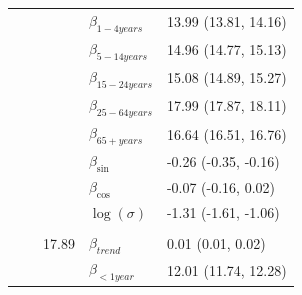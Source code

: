 \documentclass[a4paper,twoside,11pt]{report} %
\theoremstyle{definition}
\theoremstyle{definition}
\theoremstyle{definition}
\theoremstyle{definition}
\theoremstyle{remark}
\begin{document}
\begin{longtable}[t]{llrll}
\hspace{1em}\hspace{1em} &  &  & $\beta_{1-4 years}$ & 13.99 (13.81, 14.16)\\

\hspace{1em}\hspace{1em} &  &  & $\beta_{5-14 years}$ & 14.96 (14.77, 15.13)\\

\hspace{1em}\hspace{1em} &  &  & $\beta_{15-24 years}$ & 15.08 (14.89, 15.27)\\

\hspace{1em}\hspace{1em} &  &  & $\beta_{25-64 years}$ & 17.99 (17.87, 18.11)\\

\hspace{1em}\hspace{1em} &  &  & $\beta_{65+ years}$ & 16.64 (16.51, 16.76)\\

\hspace{1em}\hspace{1em} &  &  & $\beta_{\sin}$ & -0.26 (-0.35, -0.16)\\

\hspace{1em}\hspace{1em}\hspace{1em}\hspace{1em} &  &  & $\beta_{\cos}$ & -0.07 (-0.16, 0.02)\\

\hspace{1em}\hspace{1em} &  &  & $\log(\sigma)$ & -1.31 (-1.61, -1.06)\\
\cmidrule{2-5}
\addlinespace[0.3em]
\multicolumn{5}{l}{\begin{math}\log(\lambda_{it})=\beta(ageGroup_{i})+\beta_{trend} t + \beta_{\sin} \sin\Big(\frac{\pi\cdot \tau_{t}}{6}\Big) + \beta_{\cos} \cos\Big(\frac{\pi \cdot \tau_{t}}{6}\Big)+\log(n_{it})\end{math}}\\
\hspace{1em}\hspace{1em} &  & 17.89 & $\beta_{trend}$ & 0.01 (0.01, 0.02)\\

\hspace{1em}\hspace{1em} &  &  & $\beta_{<1 year}$ & 12.01 (11.74, 12.28)\\


\end{longtable}
\end{document}

